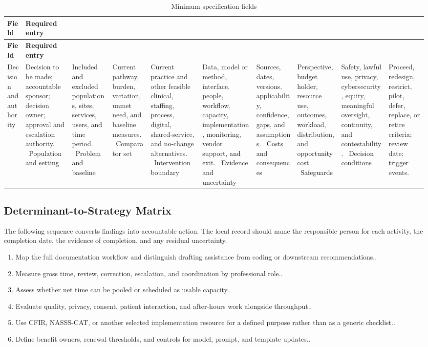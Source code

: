 \begin{longtable}{@{}p{}p{}@{}}
\caption{Minimum specification fields}
\label{tab:comp-ch04-spec-fields}\\
\toprule
\textbf{Field} & \textbf{Required entry} \\
\midrule
\endfirsthead
\toprule
\textbf{Field} & \textbf{Required entry} \\
\midrule
\endhead
\bottomrule
\endlastfoot
Decision and authority & Decision to be made; accountable sponsor; decision owner; approval and escalation authority. \
Population and setting & Included and excluded populations, sites, services, users, and time period. \
Problem and baseline & Current pathway, burden, variation, unmet need, and baseline measures. \
Comparator set & Current practice and other feasible clinical, staffing, process, digital, shared-service, and no-change alternatives. \
Intervention boundary & Data, model or method, interface, people, workflow, capacity, implementation, monitoring, vendor support, and exit. \
Evidence and uncertainty & Sources, dates, versions, applicability, confidence, gaps, and assumptions. \
Costs and consequences & Perspective, budget holder, resource use, outcomes, workload, distribution, and opportunity cost. \
Safeguards & Safety, lawful use, privacy, cybersecurity, equity, meaningful oversight, continuity, and contestability. \
Decision conditions & Proceed, redesign, restrict, pilot, defer, replace, or retire criteria; review date; trigger events. \
\end{longtable}

\subsection{Determinant-to-Strategy Matrix}
\label{sec:comp-ch04-supp-2}
The following sequence converts findings into accountable action. The local record
should name the responsible person for each activity, the completion date, the
evidence of completion, and any residual uncertainty.

\begin{enumerate}
 \item Map the full documentation workflow and distinguish drafting assistance from coding or downstream recommendations..
 \item Measure gross time, review, correction, escalation, and coordination by professional role..
 \item Assess whether net time can be pooled or scheduled as usable capacity..
 \item Evaluate quality, privacy, consent, patient interaction, and after-hours work alongside throughput..
 \item Use CFIR, NASSS-CAT, or another selected implementation resource for a defined purpose rather than as a generic checklist..
 \item Define benefit owners, renewal thresholds, and controls for model, prompt, and template updates..
\end{enumerate}

